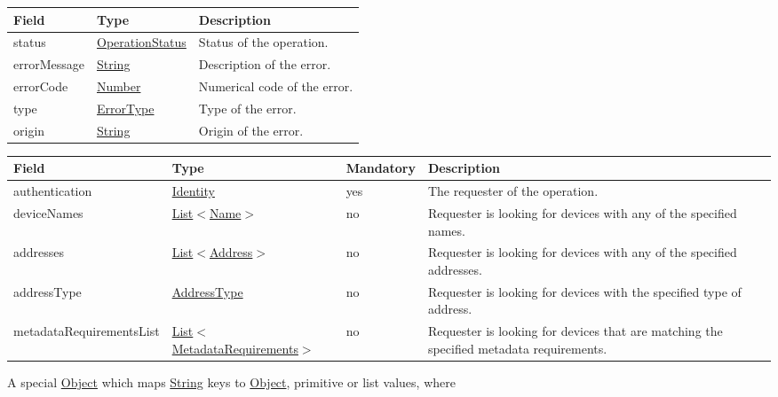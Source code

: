 \documentclass[a4paper]{arrowhead}
\newcommand{\pref}[1]{{\textcolor{ArrowheadGrey}{\hyperref[sec:model:primitives:#1]{#1}}}}
\begin{document}
\begin{table}[ht!]
\begin{tabularx}{\textwidth}{| p{4.25cm} | p{3.5cm} | X |} \hline
\rowcolor{gray!33} Field & Type      & Description \\ \hline
status & \pref{OperationStatus} & Status of the operation. \\ \hline
errorMessage & \pref{String} & Description of the error. \\ \hline
errorCode &\pref{Number}  & Numerical code of the error. \\ \hline
type & \pref{ErrorType} & Type of the error. \\ \hline
origin & \pref{String} & Origin of the error. \\ \hline
\end{tabularx}
\end{table}

\label{sec:model:DeviceLookupRequest}

\begin{table}[ht!]
\begin{tabularx}{\textwidth}{| p{4.1cm} | p{4.8cm} | p{2cm} | X |} \hline
\rowcolor{gray!33} Field & Type & Mandatory & Description \\ \hline
authentication & \hyperref[sec:model:Identity]{Identity} & yes & The requester of the operation. \\ \hline
deviceNames &  \pref{List}$<$\pref{Name}$>$ & no & Requester is looking for devices with any of the specified names. \\ \hline
addresses &  \pref{List}$<$\pref{Address}$>$ & no & Requester is looking for devices with any of the specified addresses.   \\ \hline
addressType &  \pref{AddressType} & no & Requester is looking for devices with the specified type of address. \\ \hline
metadataRequirementsList & \pref{List}$<$\hyperref[sec:model:MetadataRequirements]{MetadataRequirements}$>$ & no & Requester is looking for devices that are matching the specified metadata requirements.  \\ \hline
\end{tabularx}
\end{table}

\label{sec:model:MetadataRequirements}

A special \pref{Object} which maps \pref{String} keys to \pref{Object}, primitive or list values, where 
\end{document}
